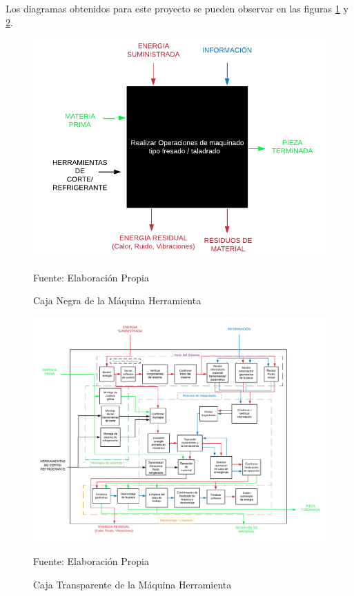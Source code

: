 Los diagramas obtenidos para este proyecto se pueden observar en las figuras \ref{fig:CajaNegra} y \ref{fig:CajaTransparente}.

\begin{figure}[htb!]
    \centering
    \includegraphics[width =  \textwidth]{Cap3_DisenoConceptual/Figura/CajaNegra.pdf}
    \caption{Caja Negra de la Máquina Herramienta}{Fuente: Elaboración Propia}
    \label{fig:CajaNegra}
\end{figure}

\begin{figure}[htb!]
    \centering
    \includegraphics[width= \textwidth]{Cap3_DisenoConceptual/Figura/CajaTransparente.pdf}
    \caption{Caja Transparente de la Máquina Herramienta}{Fuente: Elaboración Propia}
    \label{fig:CajaTransparente}
\end{figure}

